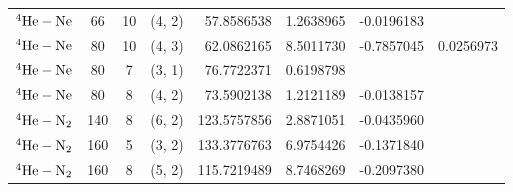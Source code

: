 \begin{table}[h]
\begin{tabular}{lcccD{.}{.}{3.7}D{.}{.}{2.7}D{.}{.}{1.7}D{.}{.}{1.7}}
    ${\rm ^4He-Ne}$ & 66 & 10 & (4, 2) & 57.8586538 & 1.2638965 & -0.0196183 &  \\
    ${\rm ^4He-Ne}$ & 80 & 10 & (4, 3) & 62.0862165 & 8.5011730 & -0.7857045 & 0.0256973 \\
    ${\rm ^4He-Ne}$ & 80 & 7 & (3, 1) & 76.7722371 & 0.6198798 &  &  \\
    ${\rm ^4He-Ne}$ & 80 & 8 & (4, 2) & 73.5902138 & 1.2121189 & -0.0138157 &  \\
    ${\rm ^4He-N_2}$ & 140 & 8 & (6, 2) & 123.5757856 & 2.8871051 & -0.0435960 &  \\
    ${\rm ^4He-N_2}$ & 160 & 5 & (3, 2) & 133.3776763 & 6.9754426 & -0.1371840 &  \\
    ${\rm ^4He-N_2}$ & 160 & 8 & (5, 2) & 115.7219489 & 8.7468269 & -0.2097380 &  \\
    \bottomrule
  \end{tabular}
\end{table}
